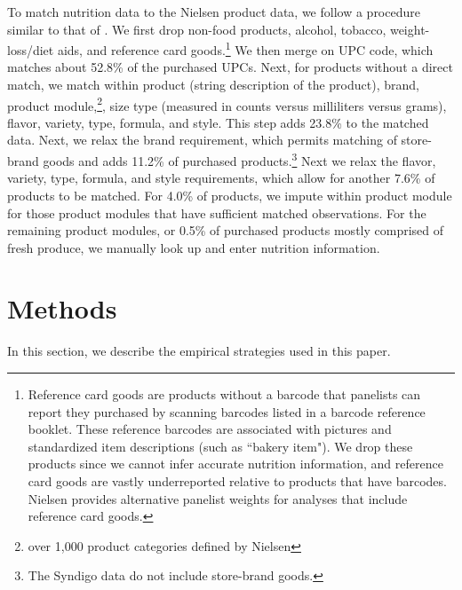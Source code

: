 \documentclass[12pt]{article}
\begin{document}
To match nutrition data to the Nielsen product data, we follow a procedure similar to that of \textcite{dubois2014prices}. We first drop non-food products, alcohol, tobacco, weight-loss/diet aids, and reference card goods.\footnote{Reference card goods are products without a barcode that panelists can report they purchased by scanning barcodes listed in a barcode reference booklet. These reference barcodes are associated with pictures and standardized item descriptions (such as ``bakery item"). We drop these products since we cannot infer accurate nutrition information, and reference card goods are vastly underreported relative to products that have barcodes. Nielsen provides alternative panelist weights for analyses that include reference card goods.} %
We then merge on UPC code, which matches about 52.8\% of the purchased UPCs. Next, for products without a direct match, we match within product (string description of the product), brand, product module,\footnote{over 1,000 product categories defined by Nielsen}, size type (measured in counts versus milliliters versus grams), flavor, variety, type, formula, and style. This step adds 23.8\% to the matched data. Next, we relax the brand requirement, which permits matching of store-brand goods and adds 11.2\% of purchased products.\footnote{The Syndigo data do not include store-brand goods.} Next we relax the flavor, variety, type, formula, and style requirements, which allow for another 7.6\% of products to be matched. For 4.0\% of products, we impute within product module for those product modules that have sufficient matched observations. For the remaining product modules, or 0.5\% of purchased products mostly comprised of fresh produce, we manually look up and enter nutrition information.


\section{Methods} \label{methods}

In this section, we describe the empirical strategies used in this paper.

\end{document}
